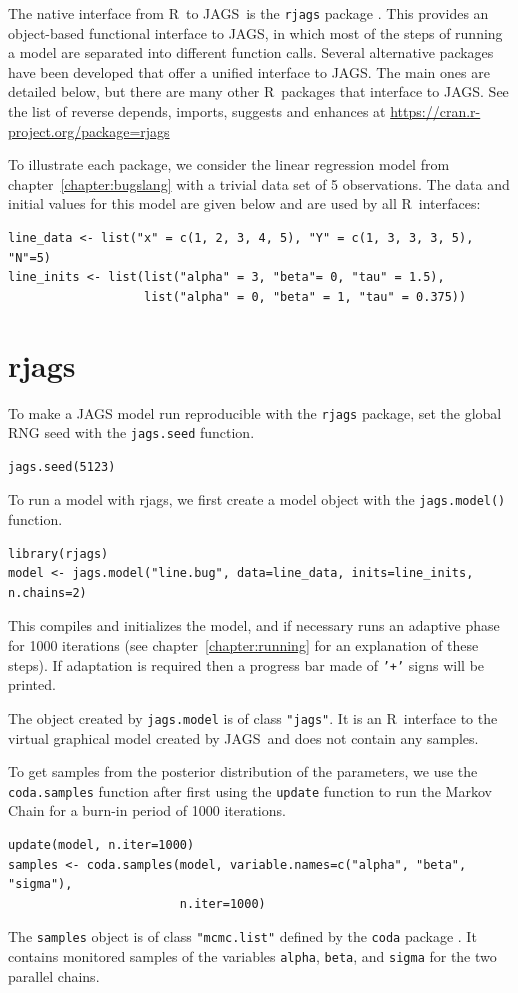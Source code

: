 \documentclass[11pt, a4paper, titlepage]{report}
\newcommand{\JAGS}{\textsf{JAGS}}
\newcommand{\R}{\textsf{R}}
\begin{document}
The native interface from \R\ to \JAGS\ is the \texttt{rjags} package
\citep{PlummerRjags}. This provides an object-based functional
interface to \JAGS, in which most of the steps of running a model are
separated into different function calls. Several alternative packages
have been developed that offer a unified interface to \JAGS. The
main ones are detailed below, but there are many other \R\ packages that
interface to \JAGS. See the list of reverse depends, imports, suggests
and enhances at \url{https://cran.r-project.org/package=rjags}

To illustrate each package, we consider the linear regression
model from chapter~\ref{chapter:bugslang} with a trivial data set
of 5 observations. The data and initial values for this model
are given below and are used by all \R\ interfaces:
\begin{verbatim}
line_data <- list("x" = c(1, 2, 3, 4, 5), "Y" = c(1, 3, 3, 3, 5), "N"=5)
line_inits <- list(list("alpha" = 3, "beta"= 0, "tau" = 1.5),
                   list("alpha" = 0, "beta" = 1, "tau" = 0.375))
\end{verbatim}

\section{rjags}
\label{section:R:rjags}

To make a JAGS model run reproducible with the \texttt{rjags} package,
set the global RNG seed with the \texttt{jags.seed} function.
\begin{verbatim}
jags.seed(5123)
\end{verbatim}

To run a model with \textsf{rjags}, we first create a model object
with the \texttt{jags.model()} function.
\begin{verbatim}
library(rjags)
model <- jags.model("line.bug", data=line_data, inits=line_inits, n.chains=2)
\end{verbatim}
This compiles and initializes the model, and if necessary runs an
adaptive phase for 1000 iterations (see chapter~\ref{chapter:running}
for an explanation of these steps). If adaptation is required then a
progress bar made of \texttt{'+'} signs will be printed.

The object created by \texttt{jags.model} is of class \texttt{"jags"}. It is
an \R\ interface to the virtual graphical model created by \JAGS\ and does
not contain any samples.

To get samples from the posterior distribution of the parameters, we
use the \texttt{coda.samples} function after first using the
\texttt{update} function to run the Markov Chain for a burn-in period
of 1000 iterations.
\begin{verbatim}
update(model, n.iter=1000) 
samples <- coda.samples(model, variable.names=c("alpha", "beta", "sigma"), 
                        n.iter=1000)
\end{verbatim}
The \texttt{samples} object is of class \texttt{"mcmc.list"} defined by
the \texttt{coda} package \citep{PlummerEtal2005}. It contains
monitored samples of the variables \texttt{alpha}, \texttt{beta}, and
\texttt{sigma} for the two parallel chains.
\end{document}
